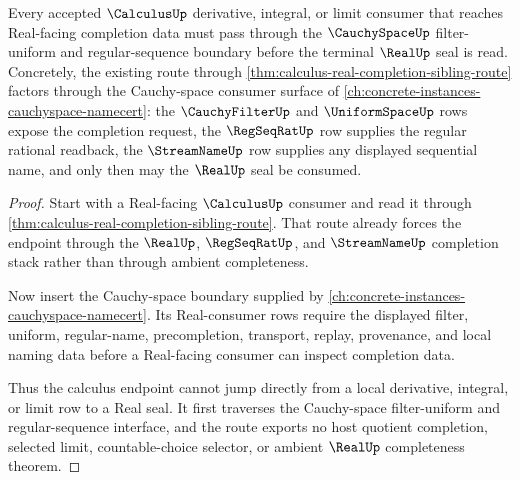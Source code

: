 \begin{theorem}
\label{thm:calculus-real-completion-dependency-link}
Every accepted $\CalculusUp$ derivative, integral, or limit consumer that reaches Real-facing completion data must pass through the $\CauchySpaceUp$ filter-uniform and regular-sequence boundary before the terminal $\RealUp$ seal is read. Concretely, the existing route through \autoref{thm:calculus-real-completion-sibling-route} factors through the Cauchy-space consumer surface of \autoref{ch:concrete-instances-cauchyspace-namecert}: the $\CauchyFilterUp$ and $\UniformSpaceUp$ rows expose the completion request, the $\RegSeqRatUp$ row supplies the regular rational readback, the $\StreamNameUp$ row supplies any displayed sequential name, and only then may the $\RealUp$ seal be consumed.
\end{theorem}
\begin{proof}
Start with a Real-facing $\CalculusUp$ consumer and read it through \autoref{thm:calculus-real-completion-sibling-route}. That route already forces the endpoint through the $\RealUp$, $\RegSeqRatUp$, and $\StreamNameUp$ completion stack rather than through ambient completeness.

Now insert the Cauchy-space boundary supplied by \autoref{ch:concrete-instances-cauchyspace-namecert}. Its Real-consumer rows require the displayed filter, uniform, regular-name, precompletion, transport, replay, provenance, and local naming data before a Real-facing consumer can inspect completion data.

Thus the calculus endpoint cannot jump directly from a local derivative, integral, or limit row to a Real seal. It first traverses the Cauchy-space filter-uniform and regular-sequence interface, and the route exports no host quotient completion, selected limit, countable-choice selector, or ambient $\RealUp$ completeness theorem.
\end{proof}
